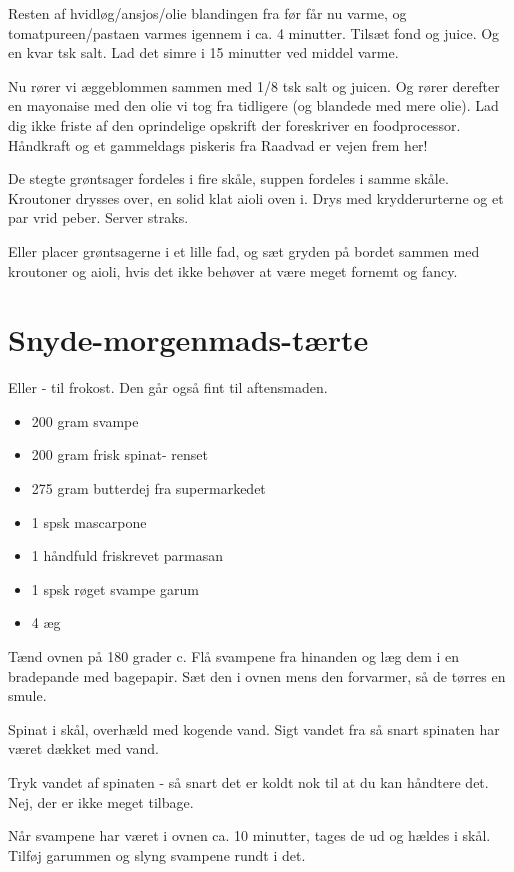 \documentclass[
]{book}
\providecommand{\tightlist}{%
  \setlength{\itemsep}{0pt}\setlength{\parskip}{0pt}}
\begin{document}
Resten af hvidløg/ansjos/olie blandingen fra før får nu varme, og tomatpureen/pastaen
varmes igennem i ca. 4 minutter. Tilsæt fond og juice. Og en kvar tsk salt.
Lad det simre i 15 minutter ved middel varme.

Nu rører vi æggeblommen sammen med 1/8 tsk salt og juicen. Og rører derefter
en mayonaise med den olie vi tog fra tidligere (og blandede med mere olie).
Lad dig ikke friste af den oprindelige opskrift der foreskriver en foodprocessor.
Håndkraft og et gammeldags piskeris fra Raadvad er vejen frem her!

De stegte grøntsager fordeles i fire skåle,
suppen fordeles i samme skåle. Kroutoner drysses over, en solid klat aioli oven i.
Drys med krydderurterne og et par vrid peber. Server straks.

Eller placer grøntsagerne i et lille fad, og sæt gryden på bordet sammen med
kroutoner og aioli, hvis det ikke behøver at være meget fornemt og fancy.

\hypertarget{snyde-morgenmads-tuxe6rte}{%
\chapter{Snyde-morgenmads-tærte}\label{snyde-morgenmads-tuxe6rte}}

Eller - til frokost. Den går også fint til aftensmaden.

\begin{itemize}
\tightlist
\item
  200 gram svampe
\item
  200 gram frisk spinat- renset
\item
  275 gram butterdej fra supermarkedet
\item
  1 spsk mascarpone
\item
  1 håndfuld friskrevet parmasan
\item
  1 spsk røget svampe garum
\item
  4 æg
\end{itemize}

Tænd ovnen på 180 grader c.
Flå svampene fra hinanden og læg dem i en bradepande med
bagepapir. Sæt den i ovnen mens den forvarmer, så de
tørres en smule.

Spinat i skål, overhæld med kogende vand. Sigt vandet fra så
snart spinaten har været dækket med vand.

Tryk vandet af spinaten - så snart det er koldt nok til at
du kan håndtere det. Nej, der er ikke meget tilbage.

Når svampene har været i ovnen ca. 10 minutter, tages de ud
og hældes i skål. Tilføj garummen og slyng svampene rundt i det.
\end{document}
